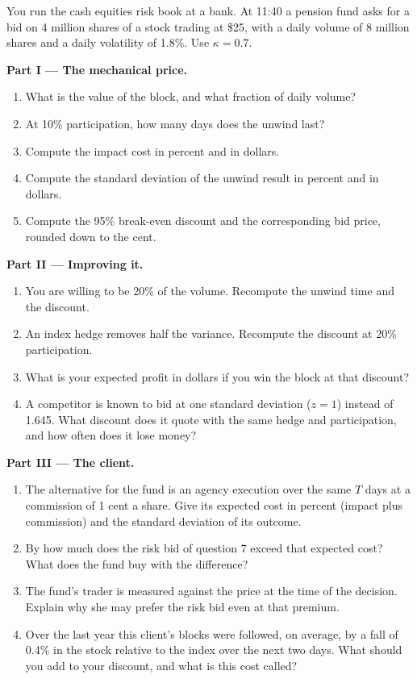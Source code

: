 \begin{problem}\label{pb:m1:the-sell-side:1}
You run the cash equities risk book at a bank. At 11:40 a pension fund asks
for a bid on 4 million shares of a stock trading at \$25, with a daily volume
of 8 million shares and a daily volatility of 1.8\%. Use $\kappa = 0.7$.

\medskip\noindent\textbf{Part I --- The mechanical price.}
\begin{enumerate}
\item What is the value of the block, and what fraction of daily volume?
\item At 10\% participation, how many days does the unwind last?
\item Compute the impact cost in percent and in dollars.
\item Compute the standard deviation of the unwind result in percent and in
dollars.
\item Compute the 95\% break-even discount and the corresponding bid price,
rounded down to the cent.
\end{enumerate}

\medskip\noindent\textbf{Part II --- Improving it.}
\begin{enumerate}[resume]
\item You are willing to be 20\% of the volume. Recompute the unwind time
and the discount.
\item An index hedge removes half the variance. Recompute the discount at
20\% participation.
\item What is your expected profit in dollars if you win the block at that
discount?
\item A competitor is known to bid at one standard deviation ($z = 1$)
instead of 1.645. What discount does it quote with the same hedge and
participation, and how often does it lose money?
\end{enumerate}

\medskip\noindent\textbf{Part III --- The client.}
\begin{enumerate}[resume]
\item The alternative for the fund is an agency execution over the same
$T$ days at a commission of 1 cent a share. Give its expected cost in
percent (impact plus commission) and the standard deviation of its outcome.
\item By how much does the risk bid of question 7 exceed that expected
cost? What does the fund buy with the difference?
\item The fund's trader is measured against the price at the time of the
decision. Explain why she may prefer the risk bid even at that premium.
\item Over the last year this client's blocks were followed, on average, by
a fall of 0.4\% in the stock relative to the index over the next two days.
What should you add to your discount, and what is this cost called?
\end{enumerate}


\end{problem}
